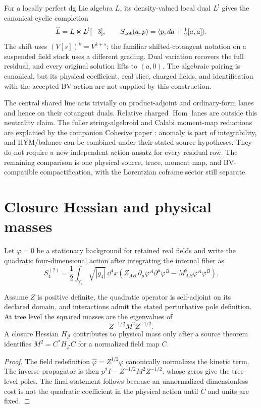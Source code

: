 \documentclass[11pt]{article}
\begin{document}
For a locally perfect dg Lie algebra $L$, its density-valued local dual
$L^!$ gives the canonical cyclic completion
\[
 \widehat L=L\ltimes L^![-3],\qquad
 S_{\rm cot}(a,p)=\langle p,da+\tfrac12[a,a]\rangle.
\]
The shift uses $(V[s])^k=V^{k+s}$; the familiar shifted-cotangent notation
on a suspended field stack uses a different grading. Dual variation
recovers the full residual, and every original solution lifts to $(a,0)$.
The algebraic pairing is canonical, but its physical coefficient, real
slice, charged fields, and identification with the accepted BV action
are not supplied by this construction.

The central shared line acts trivially on product-adjoint and ordinary-form
lanes and hence on their cotangent duals. Relative charged
$\operatorname{Hom}$ lanes are outside this neutrality claim. The fuller
string-algebroid and Calabi moment-map reductions are explained by the
companion Cohesive paper \cite{Cohesive14}: anomaly is part of integrability,
and HYM/balance can be combined under their stated source hypotheses.
They do not require a new independent action ansatz for every residual row.
The remaining comparison is one physical source, trace, moment map, and
BV-compatible compactification, with the Lorentzian coframe sector still
separate.

\section{Closure Hessian and physical masses}

Let $\varphi=0$ be a stationary background for retained real fields and write
the quadratic four-dimensional action after integrating the internal fiber as
\[
 S_4^{(2)}
 =\frac12\int_{Y_4}\sqrt{|g_4|}\,\dd^4x
 \left(
 Z_{AB}\,\partial_\mu\varphi^A\partial^\mu\varphi^B
 -M^2_{AB}\varphi^A\varphi^B
 \right).
\]

\begin{theorem}
Assume $Z$ is positive definite, the quadratic operator is self-adjoint on its
declared domain, and interactions admit the stated perturbative pole
definition.  At tree level the squared masses are the eigenvalues of
\[
 Z^{-1/2}M^2Z^{-1/2}.
\]
A closure Hessian $H_{\mathcal J}$ contributes to physical mass only after a
source theorem identifies $M^2=C^*H_{\mathcal J}C$ for a normalized field map
$C$.
\end{theorem}

\begin{proof}
The field redefinition $\widehat\varphi=Z^{1/2}\varphi$ canonically normalizes
the kinetic term.  The inverse propagator is then
$p^2I-Z^{-1/2}M^2Z^{-1/2}$, whose zeros give the tree-level poles.  The final
statement follows because an unnormalized dimensionless cost is not the
quadratic coefficient in the physical action until $C$ and units are fixed.
\end{proof}
\end{document}

